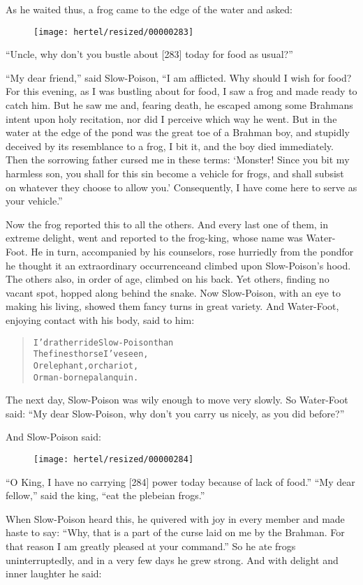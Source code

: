 \documentclass[article, twoside, 10pt]{memoir}
\renewenvironment{verbatim}{%
\begin{quote}%
\vskip -10pt%
\begin{alltt}\normalfont\small}{\end{alltt}%
\end{quote}%
\vskip -10pt
} %
\begin{document}
As he waited thus, a frog came to the edge of the water and asked:
\begin{figure}[p]\texttt{[image: hertel/resized/00000283]}\end{figure}``Uncle, why don't you bustle about [283] today for food as usual?''

``My dear friend,'' said Slow-Poison,
``I am afflicted. Why should I wish for food? For this evening, as I was bustling about for food, I saw a frog and made ready to catch him. But he saw me and, fearing death, he escaped among some Brahmans intent upon holy recitation, nor did I perceive which way he went. But in the water at the edge of the pond was the great toe of a Brahman boy, and stupidly deceived by its resemblance to a frog, I bit it, and the boy died immediately. Then the sorrowing father cursed me in these terms: `Monster! Since you bit my harmless son, you shall for this sin become a vehicle for frogs, and shall subsist on whatever they choose to allow you.' Consequently, I have come here to serve as your vehicle.''

Now the frog reported this to all the others. And every last one of
them, in extreme delight, went and reported to the frog-king, whose
name was Water-Foot. He in turn, accompanied by his counselors,
rose hurriedly from the pond{\textemdash}for he thought it an extraordinary
occurrence{\textemdash}and climbed upon Slow-Poison's hood. The others also,
in order of age, climbed on his back. Yet others, finding no vacant
spot, hopped along behind the snake. Now Slow-Poison, with an eye
to making his living, showed them fancy turns in great variety. And
Water-Foot, enjoying contact with his body, said to him:

\begin{verbatim}
I'd rather ride Slow-Poison than
The finest horse I've seen,
Or elephant, or chariot,
Or man-borne palanquin.
\end{verbatim}
The next day, Slow-Poison was wily enough to move very slowly. So
Water-Foot said:
``My dear Slow-Poison, why don't you carry us nicely, as you did before?''

And Slow-Poison said:
\begin{figure}[p]\texttt{[image: hertel/resized/00000284]}\end{figure}``O King, I have no carrying [284] power today because of lack of food.''
``My dear fellow,'' said the king, ``eat the plebeian frogs.''

When Slow-Poison heard this, he quivered with joy in every member
and made haste to say:
``Why, that is a part of the curse laid on me by the Brahman. For that reason I am greatly pleased at your command.''
So he ate frogs uninterruptedly, and in a very few days he grew
strong. And with delight and inner laughter he said:
\end{document}
